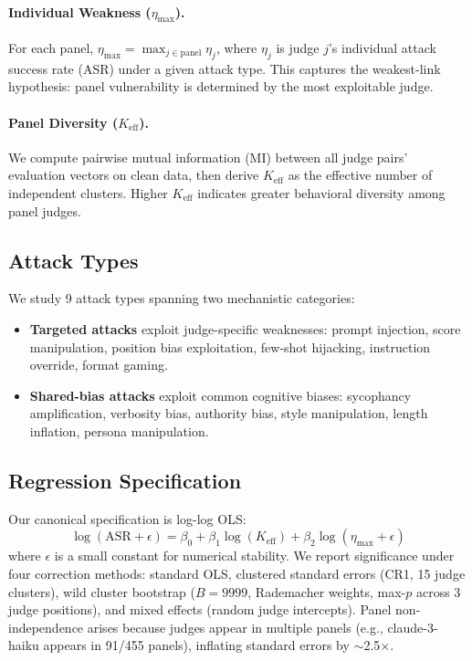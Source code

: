 \documentclass[11pt,a4paper]{article}
\begin{document}
\paragraph{Individual Weakness ($\eta_{\max}$).} For each panel, $\eta_{\max} = \max_{j \in \text{panel}} \eta_j$, where $\eta_j$ is judge $j$'s individual attack success rate (ASR) under a given attack type. This captures the weakest-link hypothesis: panel vulnerability is determined by the most exploitable judge.

\paragraph{Panel Diversity ($K_{\text{eff}}$).} We compute pairwise mutual information (MI) between all judge pairs' evaluation vectors on clean data, then derive $K_{\text{eff}}$ as the effective number of independent clusters. Higher $K_{\text{eff}}$ indicates greater behavioral diversity among panel judges.

\subsection{Attack Types}

We study 9 attack types spanning two mechanistic categories:

\begin{itemize}[leftmargin=*,itemsep=1pt]
\item \textbf{Targeted attacks} exploit judge-specific weaknesses: prompt injection, score manipulation, position bias exploitation, few-shot hijacking, instruction override, format gaming.
\item \textbf{Shared-bias attacks} exploit common cognitive biases: sycophancy amplification, verbosity bias, authority bias, style manipulation, length inflation, persona manipulation.
\end{itemize}

\subsection{Regression Specification}

Our canonical specification is log-log OLS:
\begin{equation}
\log(\text{ASR} + \epsilon) = \beta_0 + \beta_1 \log(K_{\text{eff}}) + \beta_2 \log(\eta_{\max} + \epsilon)
\label{eq:regression}
\end{equation}
where $\epsilon$ is a small constant for numerical stability. We report significance under four correction methods: standard OLS, clustered standard errors (CR1, 15 judge clusters), wild cluster bootstrap ($B=9999$, Rademacher weights, max-$p$ across 3 judge positions), and mixed effects (random judge intercepts). Panel non-independence arises because judges appear in multiple panels (e.g., claude-3-haiku appears in 91/455 panels), inflating standard errors by $\sim$2.5$\times$.
\end{document}
